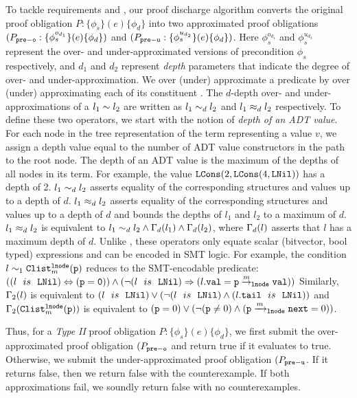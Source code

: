 To tackle requirements  and ,
our proof discharge algorithm converts the original proof obligation $P: \{\phi_s\} (e) \{\phi_d\}$
into two approximated proof obligations $(P_{{\tt pre-o}}: \{\phi^{o_{d_1}}_s\} (e) \{\phi_d\})$
and $(P_{{\tt pre-u}}: \{\phi^{u_{d_2}}_s\} (e) \{\phi_d\})$.
Here $\phi^{o_{d_1}}_s$ and
$\phi^{u_{d_2}}_s$ represent the over- and under-approximated
versions of precondition $\phi_s$ respectively, and $d_1$ and $d_2$ represent
{\em depth} parameters that indicate the degree of over- and
under-approximation. We over (under) approximate a predicate by over (under)
approximating each of its constituent \recursiveRelation{}.
The $d$-depth over- and under-approximations of a \recursiveRelation{} $l_1\sim{}l_2$
are written as $l_1\sim_dl_2$ and $l_1\approx_dl_2$ respectively.
To define these two operators, we start with the notion of {\em depth of an ADT value}.
For each node in the tree representation of the term representing a value $v$,
we assign a depth value equal to the number of ADT value constructors in the path
to the root node. The depth of an ADT value is the maximum of the depths of all nodes in
its term. For example, the value ${\tt LCons}(2, {\tt LCons}(4, {\tt LNil}))$ has a depth
of 2. $l_1\sim_dl_2$ asserts equality of the corresponding structures and values
up to a depth of $d$. $l_1\approx_dl_2$ asserts equality of the corresponding structures
and values up to a depth of $d$ and bounds the depths of $l_1$ and $l_2$ to a maximum of $d$.
$l_1\approx_dl_2$ is equivalent to $l_1\sim_dl_2 \land \Gamma_d(l_1) \land \Gamma_d(l_2)$,
where $\Gamma_d(l)$ asserts that $l$ has a maximum depth of $d$.
Unlike \recursiveRelations{}, these operators only equate
scalar (bitvector, bool typed) expressions and can be encoded in SMT logic.
For example, the condition $l\sim_1{\tt Clist}^{{\tt lnode}}_{m}({\tt p})$
reduces to the SMT-encodable predicate:
$
((l\ \ is\ \ {\tt LNil}) \Leftrightarrow {\tt (p = 0)}) \land (\neg(l\ \ is\ \ {\tt LNil})\Rightarrow(l{\tt.val}={\tt p} \overset{m}{\rightarrow}_{{\tt lnode}} {\tt val}))
$
Similarly, $\Gamma_2(l)$ is equivalent to
$(l\ \ is\ \ {\tt LNil}) \vee (\neg(l\ \ is\ \ {\tt LNil})\land(l{\tt .tail}\ \ is\ \ {\tt LNil}))$
and $\Gamma_2({\tt Clist}^{{\tt lnode}}_{m}({\tt p}))$
is equivalent to
$({\tt p}=0) \vee (\neg({\tt p}\neq 0)\land({\tt p}\xrightarrow[]{m}_{{\tt lnode}}\mathrm{\tt next}=0))$.

Thus, for a {\em Type II} proof obligation $P: \{\phi_s\} (e) \{\phi_d\}$,
we first submit the over-approximated proof obligation $(P_{{\tt pre-o}}$
and return true if it evaluates to true.
Otherwise, we submit the under-approximated proof obligation $(P_{{\tt pre-u}}$.
If it returns false, then we return false with the counterexample.
If both approximations fail, we soundly return false with no counterexamples.

